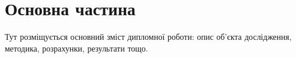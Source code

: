 \chapter{Основна частина}

Тут розміщується основний зміст дипломної роботи:
опис об’єкта дослідження, методика, розрахунки, результати тощо.
